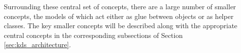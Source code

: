 
Surrounding these central set of concepts, there are a large number of
smaller concepts, the models of which act either as glue between
objects or as helper classes.  The key smaller concepts will be described along
with the appropriate central concepts in the corresponding subsections
of Section \ref{sec:kds_architecture}.




